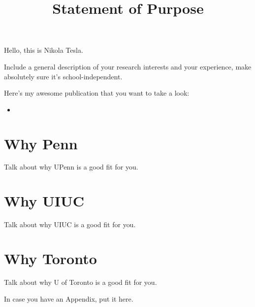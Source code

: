\documentclass{article}
\begin{document}
\title{Statement of Purpose}
\maketitle

Hello, this is Nikola Tesla.

Include a general description of your research interests and your experience,
make absolutely sure it's school-independent.

Here's my awesome publication that you want to take a look:
\begin{itemize}
  \item {}
\end{itemize}

\ifdefined{}
\section*{Why Penn}
Talk about why UPenn is a good fit for you.
\fi

\ifdefined{}
\section*{Why UIUC}
Talk about why UIUC is a good fit for you.
\fi

\ifdefined{}
\section*{Why Toronto}
Talk about why U of Toronto is a good fit for you.
\fi

\newpage
\printbibliography
\appendix
In case you have an Appendix, put it here.
\end{document}
